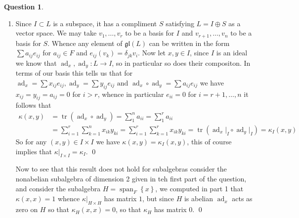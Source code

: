 \documentclass[10.5pt]{article}
\theoremstyle{definition}
\newtheorem{pb}{Question}
\numberwithin{example}{subsection}
\numberwithin{proposition}{subsection}
\newcommand{\set}[1]{\left\{#1\right\}}
\newcommand{\tand}{\text{ and }}
\begin{document}
\begin{pb}
\begin{enumerate}
            \item Since \(I \subset L\) is a subspace, it has a compliment \(S\) satisfying \(L = I \oplus S\) as a vector space. We may take \(v_1,\hdots,v_r\) to be a basis for \(I\) and \(v_{r+1},\hdots, v_n\) to be a basis for \(S\). Whence any element of \(\mathfrak{gl}(L)\) can be written in the form \(\sum a_{ij}e_{ij}\) for \(a_{ij} \in F\) and \(e_{ij}(v_k) = \delta_{jk}v_i\). Now let \(x,y \in I\), since \(I\) is an ideal we know that \(\operatorname{ad}_x,\operatorname{ad}_y: L \to I\), so in particular so does their compositon. In terms of our basis this tells us that for \(\operatorname{ad}_x = \sum x_{ij}e_{ij}, \operatorname{ad}_y = \sum y_{ij}e_{ij} \tand \operatorname{ad}_x \circ \operatorname{ad}_y = \sum a_{ij}e_{ij}\) we have \(x_{ij} = y_{ij} = a_{ij} = 0\) for \(i > r\), whence in particular \(e_{ii} = 0\) for \(i = r+1,\hdots,n\) it follows that
            \begin{align}
                \kappa(x,y) &= \operatorname{tr}(\operatorname{ad}_x\circ \operatorname{ad}_y) = \sum_1^n a_{ii} = \sum_1^r a_{ii} \\
                &= \sum_{i = 1}^r \sum_{k=1}^n x_{ik}y_{ki} = \sum_{i=1}^r\sum_{k=1}^r x_{ik}y_{ki} = \operatorname{tr}(\operatorname{ad}_x\vert_I \circ \operatorname{ad}_y \vert_I) = \kappa_I(x,y)
            \end{align}
            So for any \((x,y) \in I \times I\) we have \(\kappa(x,y) = \kappa_I(x,y)\), this of course implies that \(\kappa\vert_{I\times I} = \kappa_I\). \qed
            
            Now to see that this result does not hold for subalgebras consider the nonabelian subalgebra of dimension 2 given in teh first part of the question, and consider the subalgebra \(H = \operatorname{span}_F\set{x}\), we computed in part 1 that \(\kappa(x,x) = 1\) whence \(\kappa\vert_{H \times H}\) has matrix \(1\), but since \(H\) is abelian \(\operatorname{ad}_x\) acts as zero on \(H\) so that \(\kappa_H(x,x) = 0\), so that \(\kappa_H\) has matrix \(0\). \qed
        \end{enumerate}
    \end{pb}
\end{document}
